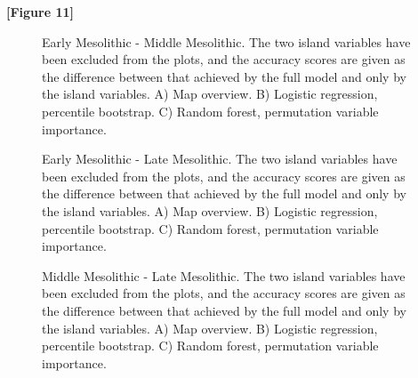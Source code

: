 \documentclass[12pt, a4paper]{article}
\begin{document}
\smallskip
\textbf{[Figure 11]}
\smallskip

\begin{figure}
	\caption[Early Mesolithic - Middle Mesolithic]{Early Mesolithic - Middle Mesolithic. The two island variables have been excluded from the plots, and the accuracy scores are given as the difference between that achieved by the full model and only by the island variables. A) Map overview. B) Logistic regression, percentile bootstrap. C) Random forest, permutation variable importance.}
	\label{fig:em_mm}
\bigbreak
	\caption[Early Mesolithic - Late Mesolithic]{Early Mesolithic - Late Mesolithic. The two island variables have been excluded from the plots, and the accuracy scores are given as the difference between that achieved by the full model and only by the island variables. A) Map overview. B) Logistic regression, percentile bootstrap. C) Random forest, permutation variable importance.}
	\label{fig:em_lm}
\end{figure}

\begin{figure}
	\caption[Middle Mesolithic- Late Mesolithic]{Middle Mesolithic - Late Mesolithic. The two island variables have been excluded from the plots, and the accuracy scores are given as the difference between that achieved by the full model and only by the island variables. A) Map overview. B) Logistic regression, percentile bootstrap. C) Random forest, permutation variable importance.}
	\label{fig:mm_lm}
\end{figure}
\end{document}
